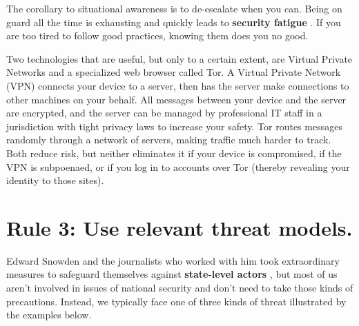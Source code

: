 \documentclass[10pt,letterpaper]{article}
\begin{document}
The corollary to situational awareness is to de-escalate when you can.  Being on
guard all the time is exhausting and quickly leads to \textbf{security fatigue}
\cite{Stan2016}. If you are too tired to follow good practices, knowing them does
you no good.

Two technologies that are useful, but only to a certain extent, are Virtual
Private Networks and a specialized web browser called Tor.  A Virtual Private
Network (VPN) connects your device to a server, then has the server make
connections to other machines on your behalf. All messages between your device
and the server are encrypted, and the server can be managed by professional IT
staff in a jurisdiction with tight privacy laws to increase your safety. Tor
routes messages randomly through a network of servers, making traffic much
harder to track. Both reduce risk, but neither eliminates it if your device is
compromised, if the VPN is subpoenaed, or if you log in to accounts over Tor
(thereby revealing your identity to those sites).

\section*{Rule 3: Use relevant threat models.}

Edward Snowden and the journalists who worked with him took extraordinary
measures to safeguard themselves against \textbf{state-level actors}
\cite{Snow2019}, but most of us aren't involved in issues of national
security and don't need to take those kinds of precautions. Instead, we
typically face one of three kinds of threat illustrated by the examples below.
\end{document}

